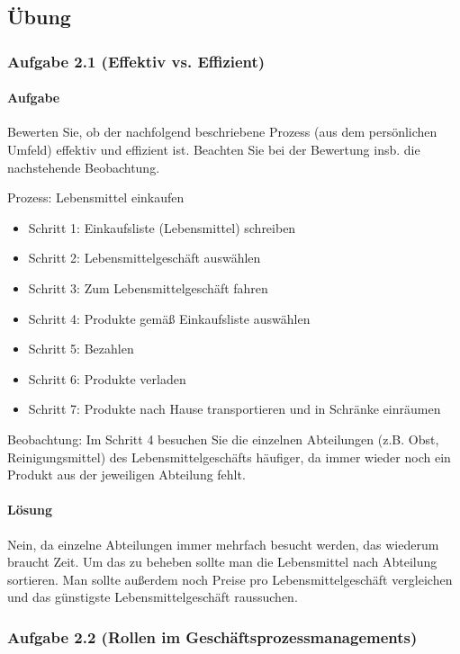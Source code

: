 \subsection{Übung}

\subsubsection*{Aufgabe 2.1 (Effektiv vs. Effizient)}
\paragraph*{Aufgabe}
    Bewerten Sie, ob der nachfolgend beschriebene Prozess (aus dem persönlichen Umfeld) effektiv und effizient ist. Beachten Sie bei der Bewertung insb. die nachstehende Beobachtung. 

    Prozess: Lebensmittel einkaufen 
    \begin{itemize}
        \item Schritt 1: Einkaufsliste (Lebensmittel) schreiben 
        \item Schritt 2: Lebensmittelgeschäft auswählen
        \item Schritt 3: Zum Lebensmittelgeschäft fahren
        \item Schritt 4: Produkte gemäß Einkaufsliste auswählen 
        \item Schritt 5: Bezahlen 
        \item Schritt 6: Produkte verladen
        \item Schritt 7: Produkte nach Hause transportieren und in Schränke einräumen 
    \end{itemize}

    Beobachtung: Im Schritt 4 besuchen Sie die einzelnen Abteilungen (z.B. Obst, Reinigungsmittel) des Lebensmittelgeschäfts häufiger, da immer wieder noch ein Produkt aus der jeweiligen Abteilung fehlt. 

\paragraph*{Lösung}
    Nein, da einzelne Abteilungen immer mehrfach besucht werden, das wiederum braucht Zeit. Um das zu beheben sollte man die Lebensmittel nach Abteilung sortieren.
    Man sollte außerdem noch Preise pro Lebensmittelgeschäft vergleichen und das günstigste Lebensmittelgeschäft raussuchen.

\subsubsection*{Aufgabe 2.2 (Rollen im Geschäftsprozessmanagements)}
